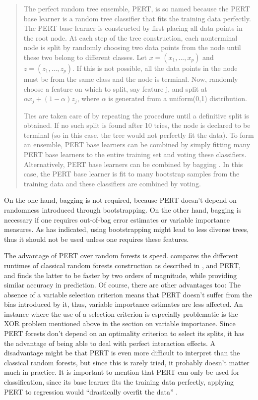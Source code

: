 \documentclass[a4paper,man,12pt,apacite]{apa6} %
\begin{document}
\begin{quotation}
The perfect random tree ensemble, PERT, is so named because the PERT base
learner is a random tree classifier that fits the training data perfectly.
The PERT base learner is constructed by first placing all data points in
the root node.
At each step of the tree construction, each nonterminal node is split by
randomly choosing two data points from the node until these two belong to
different classes.
Let \( x = (x_{1} , . . . , x_{p} ) \) and \( z = (z_{1} , . . . , z_{p} ) \).
If this is not possible, all the data points in the node must be from the
same class and the node is terminal.
Now, randomly choose a feature on which to split, say feature j, and split
at \( \alpha x_{j} + (1 - \alpha) z_{j} \), where \( \alpha \) is generated
from a uniform(0,1) distribution.

Ties are taken care of by repeating the procedure until a definitive
split is obtained.
If no such split is found after 10 tries, the node is declared to be
terminal (so in this case, the tree would not perfectly fit the data).
To form an ensemble, PERT base learners can be combined by simply fitting
many PERT base learners to the entire training set and voting these
classifiers.
Alternatively, PERT base learners can be combined by bagging
\cite{breiman1996bagging}.
In this case, the PERT base learner is fit to many bootstrap samples
from the training data and these classifiers are combined by voting.
\end{quotation}

On the one hand, bagging is not required, because PERT doesn't depend on
randomness introduced through bootstrapping.
On the other hand, bagging is necessary if one requires out-of-bag
error estimates or variable importance measures.
As \cite{liu2005maximizing} has indicated, using bootstrapping might lead
to less diverse trees, thus it should not be used unless one requires
these features.

The advantage of PERT over random forests is speed.
\cite{cutler2001pert} compares the different runtimes of classical random
forests construction as described in \cite{breiman2001random}, and PERT,
and finds the latter to be faster by two orders of magnitude,
while providing similar accuracy in prediction.
Of course, there are other advantages too:
The absence of a variable selection criterion means that PERT doesn't suffer
from the bias introduced by it, thus, variable importance estimates are less
affected.
An instance where the use of a selection criterion is especially problematic
is the XOR problem mentioned above in the section on variable importance.
Since PERT forests don't depend on an optimality criterion to select its
splits, it has the advantage of being able to deal with perfect
interaction effects.
A disadvantage might be that PERT is even more difficult to interpret than
the classical random forests, but since this is rarely tried,
it probably doesn't matter much in practice.
It is important to mention that PERT can only be used for classification,
since its base learner fits the training data perfectly, applying PERT to
regression would “drastically overfit the data” \cite{cutler2001pert}.
\end{document}
